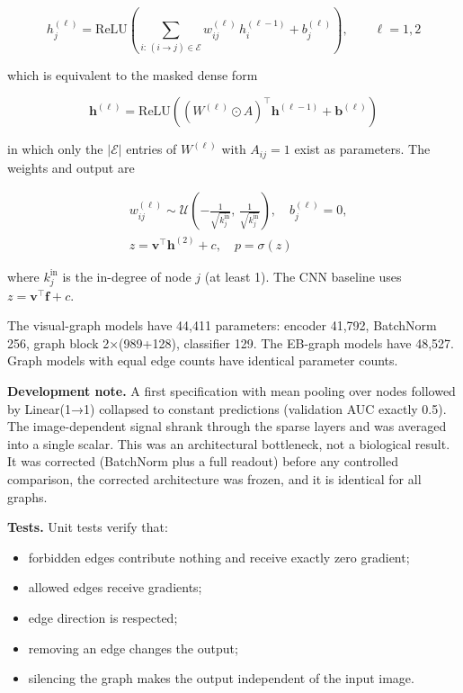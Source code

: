 \begin{equation}
h^{(\ell)}_j = \mathrm{ReLU}\left( \sum_{i:\,(i\rightarrow j)\in\mathcal{E}} w^{(\ell)}_{ij}\, h^{(\ell-1)}_i + b^{(\ell)}_j \right), \qquad \ell = 1, 2
\label{eq:4}
\end{equation}

which is equivalent to the masked dense form

\begin{equation}
\mathbf{h}^{(\ell)} = \mathrm{ReLU}\left( \left(W^{(\ell)} \odot A\right)^{\top} \mathbf{h}^{(\ell-1)} + \mathbf{b}^{(\ell)} \right)
\label{eq:5}
\end{equation}

in which only the $|\mathcal{E}|$ entries of $W^{(\ell)}$ with $A_{ij}=1$ exist as parameters. The weights and output are

\begin{equation}
\begin{aligned}
&w^{(\ell)}_{ij} \sim \mathcal{U}\left(-\frac{1}{\sqrt{k^{\mathrm{in}}_j}},\, \frac{1}{\sqrt{k^{\mathrm{in}}_j}}\right), \quad b^{(\ell)}_j = 0, \\
&z = \mathbf{v}^{\top}\mathbf{h}^{(2)} + c, \quad p = \sigma(z)
\end{aligned}
\label{eq:6}
\end{equation}

where $k^{\mathrm{in}}_j$ is the in-degree of node $j$ (at least 1). The CNN baseline uses $z = \mathbf{v}^{\top}\mathbf{f} + c$.

The visual-graph models have 44,411 parameters: encoder 41,792, BatchNorm 256, graph block 2×(989+128), classifier 129. The EB-graph models have 48,527. Graph models with equal edge counts have identical parameter counts.

\textbf{Development note.} A first specification with mean pooling over nodes followed by Linear(1→1) collapsed to constant predictions (validation AUC exactly 0.5). The image-dependent signal shrank through the sparse layers and was averaged into a single scalar. This was an architectural bottleneck, not a biological result. It was corrected (BatchNorm plus a full readout) before any controlled comparison, the corrected architecture was frozen, and it is identical for all graphs.

\textbf{Tests.} Unit tests verify that:

\begin{itemize}
\item forbidden edges contribute nothing and receive exactly zero gradient;
\item allowed edges receive gradients;
\item edge direction is respected;
\item removing an edge changes the output;
\item silencing the graph makes the output independent of the input image.
\end{itemize}

